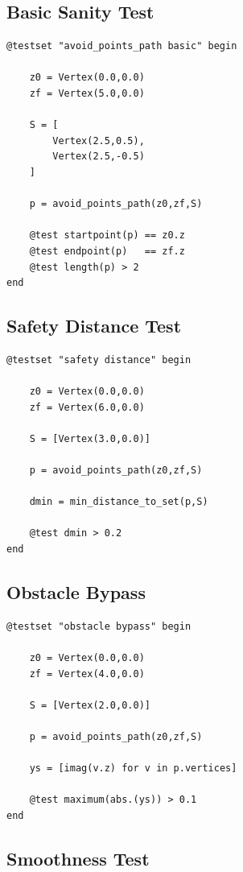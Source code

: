 \documentclass[11pt]{article}
\begin{document}
\subsection{Basic Sanity Test}

\begin{lstlisting}
@testset "avoid_points_path basic" begin

    z0 = Vertex(0.0,0.0)
    zf = Vertex(5.0,0.0)

    S = [
        Vertex(2.5,0.5),
        Vertex(2.5,-0.5)
    ]

    p = avoid_points_path(z0,zf,S)

    @test startpoint(p) == z0.z
    @test endpoint(p)   == zf.z
    @test length(p) > 2
end
\end{lstlisting}

\subsection{Safety Distance Test}

\begin{lstlisting}
@testset "safety distance" begin

    z0 = Vertex(0.0,0.0)
    zf = Vertex(6.0,0.0)

    S = [Vertex(3.0,0.0)]

    p = avoid_points_path(z0,zf,S)

    dmin = min_distance_to_set(p,S)

    @test dmin > 0.2
end
\end{lstlisting}

\subsection{Obstacle Bypass}

\begin{lstlisting}
@testset "obstacle bypass" begin

    z0 = Vertex(0.0,0.0)
    zf = Vertex(4.0,0.0)

    S = [Vertex(2.0,0.0)]

    p = avoid_points_path(z0,zf,S)

    ys = [imag(v.z) for v in p.vertices]

    @test maximum(abs.(ys)) > 0.1
end
\end{lstlisting}

\subsection{Smoothness Test}
\end{document}
